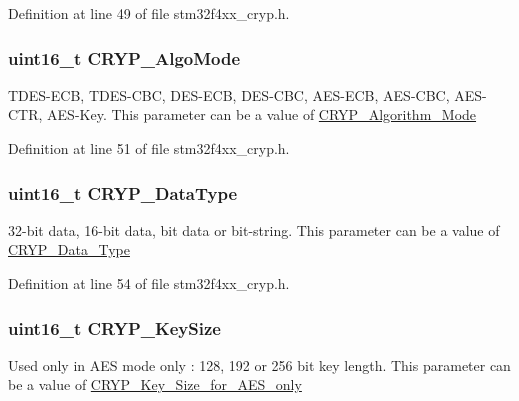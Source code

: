Definition at line 49 of file stm32f4xx\-\_\-cryp.\-h.

\hypertarget{struct_c_r_y_p___init_type_def_a2f9a49682f1d98503e13d50abf24e00b}{
\subsubsection[{C\-R\-Y\-P\-\_\-\-Algo\-Mode}]{\setlength{\rightskip}{0pt plus 5cm}uint16\-\_\-t C\-R\-Y\-P\-\_\-\-Algo\-Mode}}\label{struct_c_r_y_p___init_type_def_a2f9a49682f1d98503e13d50abf24e00b}
T\-D\-E\-S-\/\-E\-C\-B, T\-D\-E\-S-\/\-C\-B\-C, D\-E\-S-\/\-E\-C\-B, D\-E\-S-\/\-C\-B\-C, A\-E\-S-\/\-E\-C\-B, A\-E\-S-\/\-C\-B\-C, A\-E\-S-\/\-C\-T\-R, A\-E\-S-\/\-Key. This parameter can be a value of \hyperlink{group___c_r_y_p___algorithm___mode}{C\-R\-Y\-P\-\_\-\-Algorithm\-\_\-\-Mode} 

Definition at line 51 of file stm32f4xx\-\_\-cryp.\-h.

\hypertarget{struct_c_r_y_p___init_type_def_a1c1633b5c51333cfe587ac87591838b1}{
\subsubsection[{C\-R\-Y\-P\-\_\-\-Data\-Type}]{\setlength{\rightskip}{0pt plus 5cm}uint16\-\_\-t C\-R\-Y\-P\-\_\-\-Data\-Type}}\label{struct_c_r_y_p___init_type_def_a1c1633b5c51333cfe587ac87591838b1}
32-\/bit data, 16-\/bit data, bit data or bit-\/string. This parameter can be a value of \hyperlink{group___c_r_y_p___data___type}{C\-R\-Y\-P\-\_\-\-Data\-\_\-\-Type} 

Definition at line 54 of file stm32f4xx\-\_\-cryp.\-h.

\hypertarget{struct_c_r_y_p___init_type_def_a38d9de04f8126b331bca74f8093b8fd7}{
\subsubsection[{C\-R\-Y\-P\-\_\-\-Key\-Size}]{\setlength{\rightskip}{0pt plus 5cm}uint16\-\_\-t C\-R\-Y\-P\-\_\-\-Key\-Size}}\label{struct_c_r_y_p___init_type_def_a38d9de04f8126b331bca74f8093b8fd7}
Used only in A\-E\-S mode only \-: 128, 192 or 256 bit key length. This parameter can be a value of \hyperlink{group___c_r_y_p___key___size__for___a_e_s__only}{C\-R\-Y\-P\-\_\-\-Key\-\_\-\-Size\-\_\-for\-\_\-\-A\-E\-S\-\_\-only} 

